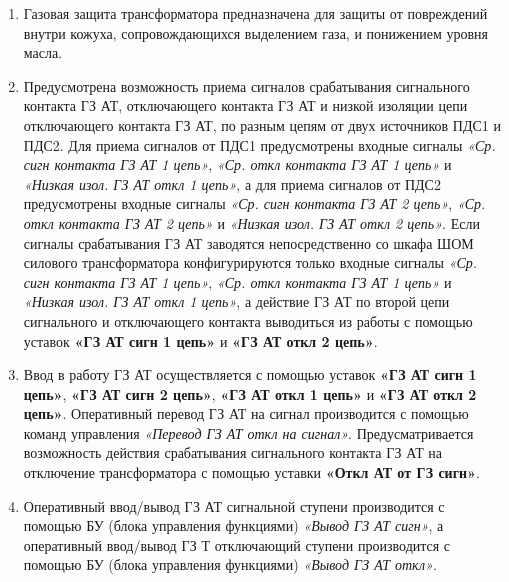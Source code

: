 \color{black}

\begin{enumerate}[label=\arabic{section}.\arabic{subsection}.\arabic*,  align=left, labelsep=4pt, leftmargin=0pt, itemindent=57pt]

\item
Газовая защита трансформатора предназначена для защиты от повреждений внутри кожуха,
сопровождающихся выделением газа, и понижением уровня масла. 

\item
Предусмотрена возможность приема сигналов срабатывания сигнального контакта ГЗ АТ,
отключающего контакта ГЗ АТ и низкой изоляции цепи отключающего контакта ГЗ АТ, по разным цепям 
от двух источников ПДС1 и ПДС2. Для приема сигналов от ПДС1 предусмотрены входные сигналы \textit{«Ср.
сигн контакта ГЗ АТ 1 цепь»}, \textit{«Ср. откл контакта ГЗ АТ 1 цепь»} и \textit{«Низкая изол. ГЗ АТ откл 1 цепь»}, а для
приема сигналов от ПДС2 предусмотрены входные сигналы \textit{«Ср. сигн контакта ГЗ АТ 2 цепь»}, \textit{«Ср. откл
контакта ГЗ АТ 2 цепь»} и \textit{«Низкая изол. ГЗ АТ откл 2 цепь»}. Если сигналы срабатывания ГЗ АТ заводятся
непосредственно со шкафа ШОМ силового трансформатора конфигурируются только входные сигналы
\textit{«Ср. сигн контакта ГЗ АТ 1 цепь»}, \textit{«Ср. откл контакта ГЗ АТ 1 цепь»} и \textit{«Низкая изол. ГЗ АТ откл 1 цепь»}, а
действие ГЗ АТ по второй цепи сигнального и отключающего контакта выводиться из работы с помощью
уставок \textbf{«ГЗ АТ сигн 1 цепь»} и \textbf{«ГЗ АТ откл 2 цепь»}.

\item
Ввод в работу ГЗ АТ осуществляется с помощью уставок \textbf{«ГЗ АТ сигн 1 цепь»}, \textbf{«ГЗ АТ сигн 2 цепь»},
\textbf{«ГЗ АТ откл 1 цепь»} и \textbf{«ГЗ АТ откл 2 цепь»}. Оперативный перевод ГЗ АТ на сигнал производится
с помощью команд управления \textit{«Перевод ГЗ АТ откл на сигнал»}. Предусматривается возможность действия
срабатывания сигнального контакта ГЗ АТ на отключение трансформатора с помощью уставки
\textbf{«Откл АТ от ГЗ сигн»}.

\item
Оперативный ввод/вывод ГЗ АТ сигнальной ступени производится с помощью БУ (блока
управления функциями) \textit{«Вывод ГЗ АТ сигн»}, а оперативный ввод/вывод ГЗ Т отключающий ступени
производится с помощью БУ (блока управления функциями) \textit{«Вывод ГЗ АТ откл»}.


\end{enumerate}
